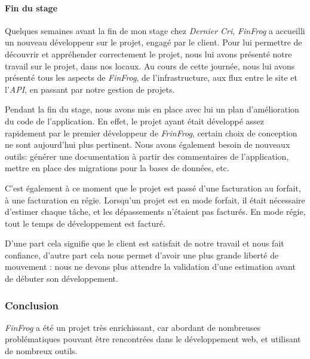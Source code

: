 \documentclass[12pt,a4paper]{article}
\begin{document}
  \paragraph{Fin du stage}\label{fin-du-stage}

  Quelques semaines avant la fin de mon stage chez \emph{Dernier Cri},
  \emph{FinFrog} a accueilli un nouveau développeur sur le projet, engagé
  par le client. Pour lui permettre de découvrir et appréhender
  correctement le projet, nous lui avons présenté notre travail sur le
  projet, dans nos locaux. Au cours de cette journée, nous lui avons
  présenté tous les aspects de \emph{FinFrog}, de l'infrastructure, aux
  flux entre le site et l'\emph{API}, en passant par notre gestion de
  projets.

  \bigskip

  Pendant la fin du stage, nous avons mis en place avec lui un plan
  d'amélioration du code de l'application. En effet, le projet ayant était
  développé assez rapidement par le premier développeur de
  \emph{FrinFrog}, certain choix de conception ne sont aujourd'hui plus
  pertinent. Nous avons également besoin de nouveaux outils: générer une
  documentation à partir des commentaires de l'application, mettre en
  place des migrations pour la bases de données, etc.

  \bigskip

  C'est également à ce moment que le projet est passé d'une facturation au
  forfait, à une facturation en régie. Lorsqu'un projet est en mode
  forfait, il était nécessaire d'estimer chaque tâche, et les dépassements
  n'étaient pas facturés. En mode régie, tout le temps de développement
  est facturé.

  \bigskip

  D'une part cela signifie que le client est satisfait de notre travail et
  nous fait confiance, d'autre part cela nous permet d'avoir une plus
  grande liberté de mouvement : nous ne devons plus attendre la validation
  d'une estimation avant de débuter son développement.

  \bigskip

  \subsubsection{Conclusion}\label{conclusion-1}

  \bigskip

  \emph{FinFrog} a été un projet très enrichissant, car abordant de
  nombreuses problématiques pouvant être rencontrées dans le développement
  web, et utilisant de nombreux outils.
\end{document}
